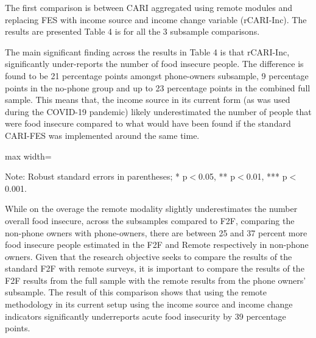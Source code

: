 \documentclass[11pt,harvard]{article}
\begin{document}
The first comparison is between CARI aggregated using remote modules and replacing FES with income source and income change variable (rCARI-Inc). The results are presented Table 4 is for all the 3 subsample comparisons.

The main significant finding across the results in Table 4 is that rCARI-Inc, significantly under-reports the number of food insecure people. The difference is found to be 21 percentage points amongst phone-owners subsample, 9 percentage points in the no-phone group and up to 23 percentage points in the combined full sample. This means that, the income source in its current form (as was used during the COVID-19 pandemic) likely underestimated the number of people that were food insecure compared to what would have been found if the standard CARI-FES was implemented around the same time.

	\begin{table}[htbp]
		\centering
		\begin{adjustbox}{max width=\textwidth}
			\begin{threeparttable}
				\caption{Impact of Survey Modality: Standard CARI-FES vs. Standard rCARI-Inc}
				\scriptsize
				 
				\label{tab:CARI_rCARI_Modality_CAR}
				\begin{tablenotes}
					\item Note: Robust standard errors in parentheses; * p$<$0.05, ** p$<$0.01, *** p$<$0.001. 
				\end{tablenotes}
			\end{threeparttable}
		\end{adjustbox}
	\end{table}

While on the overage the remote modality slightly underestimates the number overall food insecure, across the subsamples compared to F2F, comparing the non-phone owners with phone-owners, there are between 25 and 37 percent more food insecure people estimated in the F2F and Remote respectively in non-phone owners. Given that the research objective seeks to compare the results of the standard F2F with remote surveys, it is important to compare the results of the F2F results from the full sample with the remote results from the phone owners' subsample. The result of this comparison shows that using the remote methodology in its current setup using the income source and income change indicators significantly underreports acute food insecurity by 39 percentage points. 
\end{document}

